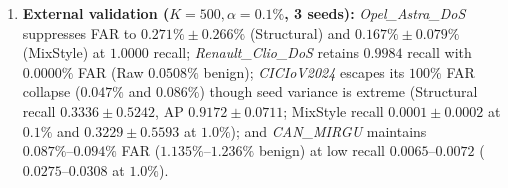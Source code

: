 \documentclass[12pt, a4paper, reqno, oneside]{book}
\begin{document}
\begin{enumerate}
    \item \textbf{External validation ($K=500, \alpha=0.1\%$, 3 seeds):} \textit{Opel\_Astra\_DoS} suppresses FAR to $0.271\% \pm 0.266\%$ (Structural) and $0.167\% \pm 0.079\%$ (MixStyle) at $1.0000$ recall; \textit{Renault\_Clio\_DoS} retains $0.9984$ recall with $0.0000\%$ FAR (Raw $0.0508\%$ benign); \textit{\mbox{CICIoV2024}} escapes its $100\%$ FAR collapse ($0.047\%$ and $0.086\%$) though seed variance is extreme (Structural recall $0.3336 \pm 0.5242$, AP $0.9172 \pm 0.0711$; MixStyle recall $0.0001 \pm 0.0002$ at $0.1\%$ and $0.3229 \pm 0.5593$ at $1.0\%$); and \textit{CAN\_MIRGU} maintains $0.087\%\text{--}0.094\%$ FAR ($1.135\%\text{--}1.236\%$ benign) at low recall $0.0065\text{--}0.0072$ ($0.0275\text{--}0.0308$ at $1.0\%$).
\end{enumerate}
\end{document}
